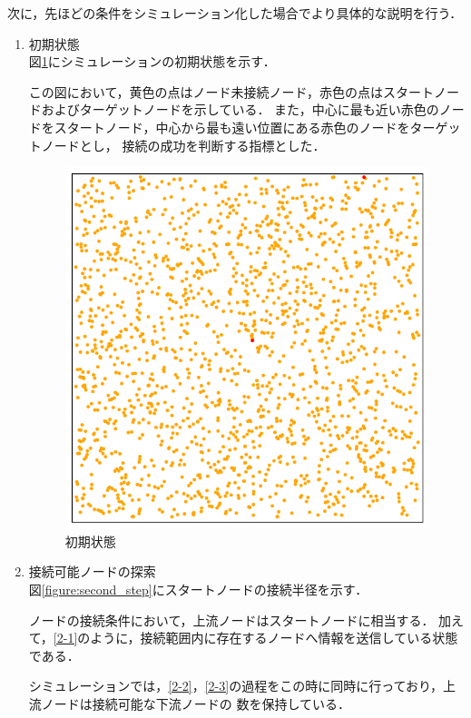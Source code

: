 \documentclass[a4paper, 11pt]{ltjsarticle}
\begin{document}
次に，先ほどの条件をシミュレーション化した場合でより具体的な説明を行う．

\begin{enumerate}[label=\textbf{(\arabic*)}]
  \item 初期状態 \\
        図\ref{figure:first_step}にシミュレーションの初期状態を示す．

        この図において，黄色の点はノード未接続ノード，赤色の点はスタートノードおよびターゲットノードを示している．
        また，中心に最も近い赤色のノードをスタートノード，中心から最も遠い位置にある赤色のノードをターゲットノードとし，
        接続の成功を判断する指標とした．
        
        \begin{figure}[H]
          \centering
          \includegraphics[width=110mm]{1_step.png}
          \caption{初期状態}
          \label{figure:first_step}
        \end{figure}
  \clearpage
  \item 接続可能ノードの探索 \\
        図\ref{figure:second_step}にスタートノードの接続半径を示す．

        ノードの接続条件において，上流ノードはスタートノードに相当する．
        加えて，\ref{2-1}のように，接続範囲内に存在するノードへ情報を送信している状態である．
        
        \indent シミュレーションでは，\ref{2-2}，\ref{2-3}の過程をこの時に同時に行っており，上流ノードは接続可能な下流ノードの
        数を保持している．


\end{enumerate}
\end{document}

